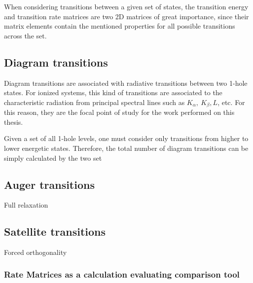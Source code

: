 When considering transitions between a given set of states, the transition energy and transition rate matrices are two 2D matrices of great importance, since their matrix elements contain the mentioned properties for all possible transitions across the set.

\subsection{Diagram transitions}

Diagram transitions are associated with radiative transitions between two 1-hole states. For ionized systems, this kind of transitions are associated to the characteristic radiation from principal spectral lines such as $K_{\alpha},\ K_{\beta}, L$, etc. For this reason, they are the focal point of study for the work performed on this thesis.

Given a set of all 1-hole levels, one must consider only transitions from higher to lower energetic states. Therefore, the total number of diagram transitions can be simply calculated by the two set 



\subsection{Auger transitions}
Full relaxation
\subsection{Satellite transitions}
Forced orthogonality

\subsubsection{Rate Matrices as a calculation evaluating comparison tool}

